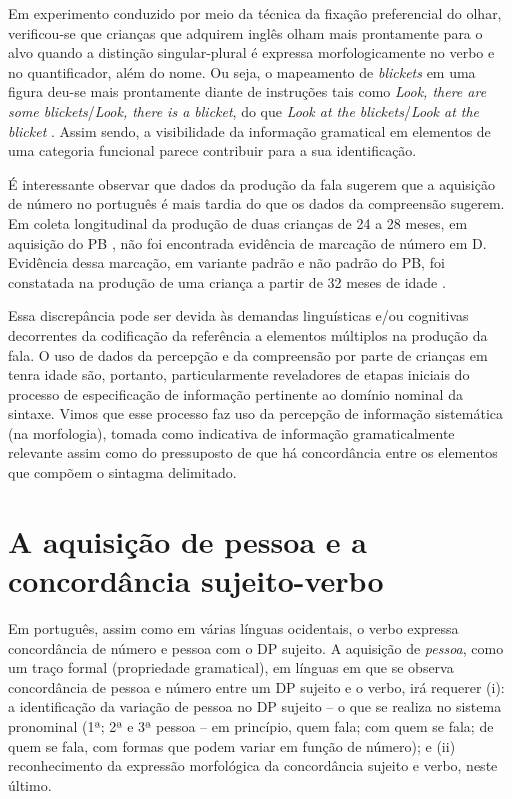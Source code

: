 \documentclass[output=paper]{LSP/langsci}
\begin{document}
Em experimento conduzido por meio da técnica da fixação preferencial do olhar, verificou-se que crianças que adquirem inglês olham mais prontamente para o alvo quando a distinção singular-plural é expressa morfologicamente no verbo e no quantificador, além do nome. Ou seja, o mapeamento de \textit{blickets} em uma figura deu-se mais prontamente diante de instruções tais como \textit{Look, there are some blickets}/\textit{Look, there is a blicket}, do que \textit{Look at the blickets}/\textit{Look at the blicket} \citep{kouider_etal2006}. Assim sendo, a visibilidade da informação gramatical em elementos de uma categoria funcional parece contribuir para a sua identificação. 

É interessante observar que dados da produção da fala sugerem que a aquisição de número no português é mais tardia do que os dados da compreensão sugerem. Em coleta longitudinal da produção de duas crianças de 24 a 28 meses, em aquisição do PB \citep{ferrarineto2003}, não foi encontrada evidência de marcação de número em D. Evidência dessa marcação, em variante padrão e não padrão do PB, foi constatada na produção de uma criança a partir de 32 meses de idade \citep{simioni2006}.

Essa discrepância pode ser devida às demandas linguísticas e/ou cognitivas decorrentes da codificação da referência a elementos múltiplos na produção da fala. O uso de dados da percepção e da compreensão por parte de crianças em tenra idade são, portanto, particularmente reveladores de etapas iniciais do processo de especificação de informação pertinente ao domínio nominal da sintaxe.  Vimos que esse processo faz uso da percepção de informação sistemática (na morfologia), tomada como indicativa de informação gramaticalmente relevante assim como do pressuposto de que há concordância entre os elementos que compõem o sintagma delimitado. 

\section{A aquisição de pessoa e a concordância sujeito-verbo}

Em português, assim como em várias línguas ocidentais, o verbo expressa concordância de número e pessoa com o DP sujeito. A aquisição de \textit{pessoa}, como um traço formal (propriedade gramatical), em línguas em que se observa concordância de pessoa e número entre um DP sujeito e o verbo, irá requerer (i):  a identificação da variação de pessoa no DP sujeito – o que se realiza no sistema pronominal (1ª; 2ª e 3ª pessoa – em princípio, quem fala; com quem se fala; de quem se fala, com formas que podem variar em função de número); e (ii) reconhecimento da expressão morfológica da concordância sujeito e verbo, neste último. 
\end{document}
